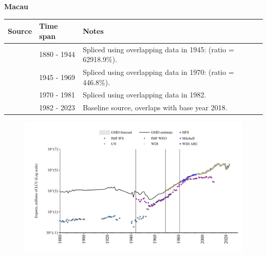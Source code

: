 \documentclass[12pt,a4paper,landscape]{article}
\begin{document}
\begin{adjustbox}{max totalsize={\paperwidth}{\paperheight},center}
\begin{minipage}[t][\textheight][t]{\textwidth}
\vspace*{0.5cm}
{}
\begin{center}
{\Large\bfseries Macau}
\end{center}
\vspace{0.5cm}
\begin{table}[H]
\centering
\small
\begin{tabular}{|l|l|l|}
\hline
\textbf{Source} & \textbf{Time span} & \textbf{Notes} \\
\hline
\rowcolor{white}\cite{HFS}& 1880 - 1944 &Spliced using overlapping data in 1945: (ratio = 62918.9\%).\\
\rowcolor{lightgray}\cite{Mitchell}& 1945 - 1969 &Spliced using overlapping data in 1970: (ratio = 446.8\%).\\
\rowcolor{white}\cite{UN}& 1970 - 1981 &Spliced using overlapping data in 1982.\\
\rowcolor{lightgray}\cite{WDI}& 1982 - 2023 &Baseline source, overlaps with base year 2018.\\
\hline
\end{tabular}
\end{table}
\begin{figure}[H]
\centering
\includegraphics[width=\textwidth,height=0.6\textheight,keepaspectratio]{graphs/MAC_exports.pdf}
\end{figure}
\end{minipage}
\end{adjustbox}
\end{document}
